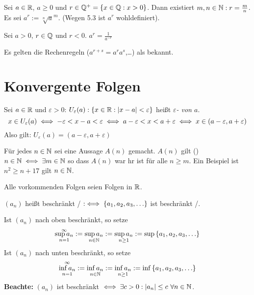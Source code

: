 \documentclass[a4paper,twoside,DIV15,BCOR12mm]{scrbook}
\begin{document}
\begin{definition}
\begin{liste}
\item Sei $a \in \mathbb{R}$, $a \ge 0 $ und $r \in \mathbb{Q}^+ = \{ x \in \mathbb{Q}: x>0\}$. Dann existiert $m,n \in \mathbb{N}: r = \frac{m}{n}$.  Es sei $a^r := \sqrt[n]{a}^m$. (Wegen 5.3 ist $a^r$ wohldefiniert).
\item Sei $a>0$, $r\in\mathbb{Q}$ und $r < 0$. $a^r = \frac{1}{a^{-r}} $
\end{liste}
\end{definition}

Es gelten die Rechenregeln ($a^{r+s} = a^r a^s$,\ldots) als bekannt.

\chapter{Konvergente Folgen}

\begin{definition}[Umgebung]
Sei $a \in \mathbb{R}$ und $\varepsilon > 0$: $U_\varepsilon(a):\{x \in \mathbb{R}: |x-a|<\varepsilon\}$ heißt \textit{$\varepsilon$- von $a$}. \\
$$ x \in U_\varepsilon(a) \iff -\varepsilon < x - a < \varepsilon \iff a - \varepsilon < x < a +  \varepsilon \iff x \in (a-\varepsilon, a+\varepsilon) $$
Also gilt: $U_\varepsilon(a) = (a-\varepsilon, a+\varepsilon)$
\end{definition}

\begin{definition}
Für jedes $n \in \mathbb{N}$ sei eine Aussage $A(n)$ gemacht. $A(n)$ gilt  (\ffa) $n \in \mathbb{N} \iff \exists m \in \mathbb{N} $ so dass $A(n)$ war hr ist für alle $n \ge m$. Ein Beispiel ist $n^2\ge n + 17$ gilt \ffa $n \in \mathbb{N}$.
\end{definition}

\begin{vereinbarung}
Alle vorkommenden Folgen seien Folgen in $\mathbb{R}$.
\end{vereinbarung}

\begin{definition}
$(a_n)$ heißt beschränkt / $:\iff \{a_1,a_2,a_3,\ldots\}$ ist beschränkt /.

Ist $(a_n)$ nach oben beschränkt, so setze
$$ \mathop{\sup{a_n}}_{n=1}^{\infty} := \mathop{\sup{a_n}}_{n\in \mathbb{N}} := \mathop{\sup{a_n}}_{n \ge 1} := \sup{\{a_1,a_2,a_3,\ldots\}}$$
Ist $(a_n)$ nach unten beschränkt, so setze
$$ \mathop{\inf{a_n}}_{n=1}^{\infty} := \mathop{\inf{a_n}}_{n\in \mathbb{N}} := \mathop{\inf{a_n}}_{n \ge 1} := \inf{\{a_1,a_2,a_3,\ldots\}}$$
\textbf{Beachte:} $(a_n)$ ist beschränkt $\iff \exists c > 0 : |a_n| \le c \ \forall n \in \mathbb{N}$.
\end{definition}
\end{document}
